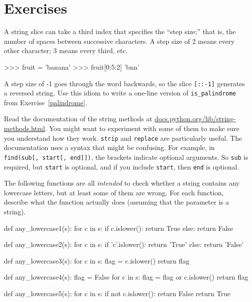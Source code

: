 \section{Exercises}

\begin{exercise}


A string slice can take a third index that specifies the ``step
size;'' that is, the number of spaces between successive characters.
A step size of 2 means every other character; 3 means every third,
etc.

\beforeverb
\begin{pycode}
>>> fruit = 'banana'
>>> fruit[0:5:2]
'bnn'
\end{pycode}
\afterverb

A step size of -1 goes through the word backwards, so
the slice \verb"[::-1]" generates a reversed string.
%
%
Use this idiom to write a one-line version of \verb"is_palindrome"
from Exercise~\ref{palindrome}.
\end{exercise}


\begin{exercise}

Read the documentation of the string methods at
\url{docs.python.org/lib/string-methods.html}.  You
might want to experiment with some of them to make sure
you understand how they work.  {\tt strip} and
{\tt replace} are particularly useful.
%
The documentation uses a syntax that might be confusing.
For example, in \verb"find(sub[, start[, end]])", the brackets
indicate optional arguments.  So {\tt sub} is required, but
{\tt start} is optional, and if you include {\tt start},
then {\tt end} is optional.
\end{exercise}

\begin{exercise}
The following functions are all {\em intended} to check whether a
string contains any lowercase letters, but at least some of them are
wrong.  For each function, describe what the function actually does
(assuming that the parameter is a string).

\beforeverb
\begin{pycode}
def any_lowercase1(s):
    for c in s:
        if c.islower():
            return True
        else:
            return False

def any_lowercase2(s):
    for c in s:
        if 'c'.islower():
            return 'True'
        else:
            return 'False'

def any_lowercase3(s):
    for c in s:
        flag = c.islower()
    return flag

def any_lowercase4(s):
    flag = False
    for c in s:
        flag = flag or c.islower()
    return flag

def any_lowercase5(s):
    for c in s:
        if not c.islower():
            return False
    return True
\end{pycode}
\afterverb

\end{exercise}


